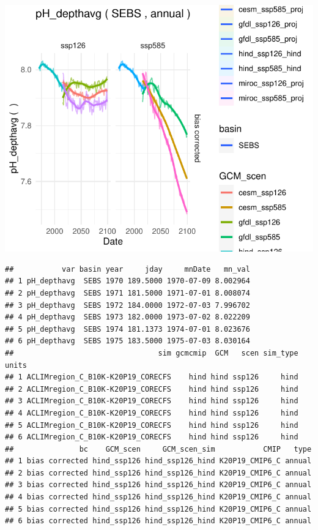 \documentclass[
]{article}
\newenvironment{Shaded}{\begin{snugshade}}{\end{snugshade}}
\newcommand{\FunctionTok}[1]{\textcolor[rgb]{0.00,0.00,0.00}{#1}}
\newcommand{\NormalTok}[1]{#1}
\newcommand{\SpecialCharTok}[1]{\textcolor[rgb]{0.00,0.00,0.00}{#1}}
\begin{document}
\begin{center}\includegraphics{ACLIM2_quickStart_files/figure-latex/unnamed-chunk-7-1} \end{center}

\begin{Shaded}
\end{Shaded}

\begin{verbatim}
##           var basin year     jday     mnDate   mn_val
## 1 pH_depthavg  SEBS 1970 189.5000 1970-07-09 8.002964
## 2 pH_depthavg  SEBS 1971 181.5000 1971-07-01 8.008074
## 3 pH_depthavg  SEBS 1972 184.0000 1972-07-03 7.996702
## 4 pH_depthavg  SEBS 1973 182.0000 1973-07-02 8.022209
## 5 pH_depthavg  SEBS 1974 181.1373 1974-07-01 8.023676
## 6 pH_depthavg  SEBS 1975 183.5000 1975-07-03 8.030164
##                                 sim gcmcmip  GCM   scen sim_type units
## 1 ACLIMregion_C_B10K-K20P19_CORECFS    hind hind ssp126     hind      
## 2 ACLIMregion_C_B10K-K20P19_CORECFS    hind hind ssp126     hind      
## 3 ACLIMregion_C_B10K-K20P19_CORECFS    hind hind ssp126     hind      
## 4 ACLIMregion_C_B10K-K20P19_CORECFS    hind hind ssp126     hind      
## 5 ACLIMregion_C_B10K-K20P19_CORECFS    hind hind ssp126     hind      
## 6 ACLIMregion_C_B10K-K20P19_CORECFS    hind hind ssp126     hind      
##               bc    GCM_scen     GCM_scen_sim           CMIP   type
## 1 bias corrected hind_ssp126 hind_ssp126_hind K20P19_CMIP6_C annual
## 2 bias corrected hind_ssp126 hind_ssp126_hind K20P19_CMIP6_C annual
## 3 bias corrected hind_ssp126 hind_ssp126_hind K20P19_CMIP6_C annual
## 4 bias corrected hind_ssp126 hind_ssp126_hind K20P19_CMIP6_C annual
## 5 bias corrected hind_ssp126 hind_ssp126_hind K20P19_CMIP6_C annual
## 6 bias corrected hind_ssp126 hind_ssp126_hind K20P19_CMIP6_C annual
\end{verbatim}
\end{document}
